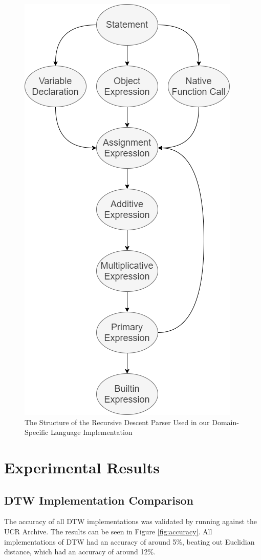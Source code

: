 \documentclass[sigconf,authordraft]{acmart}
\begin{document}
\begin{figure}
    \centering
    \includegraphics[width=0.8\linewidth]{img/parse_descent.png}
    \caption{The Structure of the Recursive Descent Parser Used in our Domain-Specific Language Implementation}
    \label{fig:parser1}
\end{figure}


\section{Experimental Results}

\subsection{DTW Implementation Comparison}
The accuracy of all DTW implementations was validated by running against the UCR Archive. The results can be seen in Figure \ref{fig:accuracy}. All implementations of DTW had an accuracy of around 5\%, beating out Euclidian distance, which had an accuracy of around 12\%.
\end{document}
